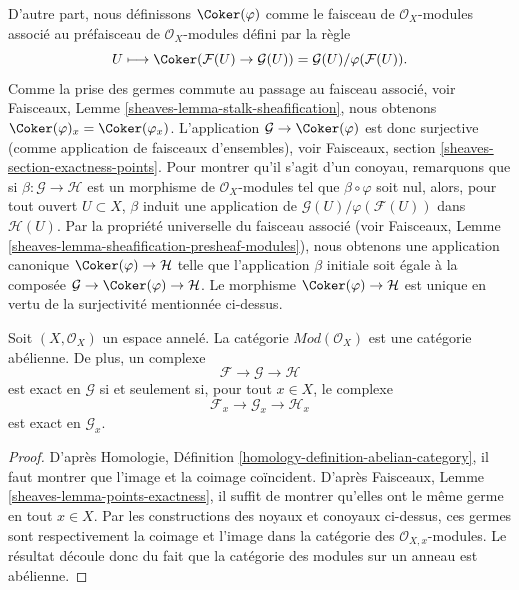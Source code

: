 \medskip\noindent
D'autre part, nous définissons $\Coker(\varphi)$ comme le faisceau de
$\mathcal{O}_X$-modules associé au préfaisceau de
$\mathcal{O}_X$-modules défini par la règle
$$
U
\longmapsto
\Coker(\mathcal{F}(U)\to \mathcal{G}(U)) =
\mathcal{G}(U)/\varphi(\mathcal{F}(U)).
$$
Comme la prise des germes commute au passage au faisceau associé, voir
Faisceaux, Lemme \ref{sheaves-lemma-stalk-sheafification}, nous obtenons
$\Coker(\varphi)_x = \Coker(\varphi_x)$. L'application
$\mathcal{G} \to \Coker(\varphi)$ est donc surjective (comme application de
faisceaux d'ensembles), voir Faisceaux, section
\ref{sheaves-section-exactness-points}. Pour montrer qu'il s'agit d'un
conoyau, remarquons que si
$\beta : \mathcal{G} \to \mathcal{H}$ est un morphisme de
$\mathcal{O}_X$-modules tel que $\beta \circ \varphi$ soit nul, alors, pour
tout ouvert $U \subset X$, $\beta$ induit une application de
$\mathcal{G}(U)/\varphi(\mathcal{F}(U))$ dans $\mathcal{H}(U)$. Par la
propriété universelle du faisceau associé (voir Faisceaux, Lemme
\ref{sheaves-lemma-sheafification-presheaf-modules}), nous obtenons une
application canonique $\Coker(\varphi) \to \mathcal{H}$ telle que
l'application $\beta$ initiale soit égale à la composée
$\mathcal{G} \to \Coker(\varphi) \to \mathcal{H}$. Le morphisme
$\Coker(\varphi) \to \mathcal{H}$ est unique en vertu de la surjectivité
mentionnée ci-dessus.

\begin{lemma}
\label{lemma-abelian}
Soit $(X, \mathcal{O}_X)$ un espace annelé. La catégorie
$\textit{Mod}(\mathcal{O}_X)$ est une catégorie abélienne. De plus, un complexe
$$
\mathcal{F} \to \mathcal{G} \to \mathcal{H}
$$
est exact en $\mathcal{G}$ si et seulement si, pour tout $x \in X$, le complexe
$$
\mathcal{F}_x \to \mathcal{G}_x \to \mathcal{H}_x
$$
est exact en $\mathcal{G}_x$.
\end{lemma}

\begin{proof}
D'après Homologie, Définition \ref{homology-definition-abelian-category},
il faut montrer que l'image et la coimage coïncident. D'après Faisceaux,
Lemme \ref{sheaves-lemma-points-exactness}, il suffit de montrer qu'elles ont
le même germe en tout $x \in X$. Par les constructions des noyaux et conoyaux
ci-dessus, ces germes sont respectivement la coimage et l'image dans la
catégorie des $\mathcal{O}_{X, x}$-modules. Le résultat découle donc du fait
que la catégorie des modules sur un anneau est abélienne.
\end{proof}

